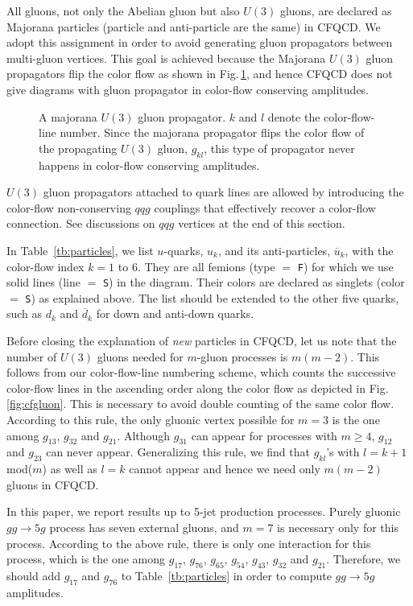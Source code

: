 All gluons, not only the Abelian gluon but also $U(3)$ gluons, are declared as Majorana particles (particle and anti-particle are the same)
in CFQCD. We adopt this assignment in order to avoid generating
gluon propagators between multi-gluon vertices. This goal is achieved because the
Majorana $U(3)$ gluon propagators flip the color flow as shown in Fig.\,\ref{fig:majoprop}, and hence
CFQCD does not give diagrams with gluon propagator in color-flow
conserving amplitudes.
\begin{figure}
\centering
{}
\caption{A majorana $U(3)$ gluon propagator. $k$ and $l$ denote the
 color-flow-line number. Since the majorana propagator
 flips the color flow of the propagating $U(3)$ gluon, $g_{kl}$, this type of
 propagator never happens in color-flow conserving amplitudes. }
\label{fig:majoprop}
\end{figure}
$U(3)$ gluon propagators attached to quark lines
are allowed by introducing the color-flow non-conserving $qqg$ couplings
that effectively recover a color-flow connection. See discussions on $qqg$
vertices at the end of this section.

In Table~\ref{tb:particles}, we list $u$-quarks, $u_k$, and its
anti-particles, $\overline{u}_k$, with the color-flow index $k=1$
to $6$. They are all femions (type $=$ {\tt F}) for which we use solid
lines (line $=$ {\tt S}) in the diagram. Their colors are declared as
singlets (color $=$ {\tt S}) as explained above. The list should be
extended to the other five quarks, such as $d_k$ and $\overline{d}_k$ for down and anti-down quarks.

Before closing the explanation of {\it new} particles in CFQCD, let us note
 that the number of $U(3)$ gluons needed for $m$-gluon processes is $m(m-2)$. This follows from
our color-flow-line numbering scheme, which counts the successive
color-flow lines in the
ascending order along the color flow as depicted in
Fig.\,\ref{fig:cfgluon}. This is necessary to avoid
double counting of the same color flow. According to this rule, the only
gluonic vertex possible for $m=3$ is the one among $g_{13}$, $g_{32}$ and
$g_{21}$. Although $g_{31}$ can appear
 for processes
 with $m\geq4$, $g_{12}$ and $g_{23}$ can
never appear. Generalizing this rule, we find that $g_{kl}$'s with $l=k+1$ mod($m$) as well as $l=k$ cannot appear and hence we need only $m(m-2)$ gluons in CFQCD.

In this paper, we report results up to 5-jet production
processes. Purely gluonic $gg\rightarrow  5g$ process has seven external
gluons, and $m=7$ is necessary only for this process. According to the
above rule, there is only one interaction for this process, which is
the one among $g_{17}$,
$g_{76}$, $g_{65}$, $g_{54}$, $g_{43}$, $g_{32}$ and
$g_{21}$. Therefore, we should
 add $g_{17}$ and $g_{76}$ to Table~\ref{tb:particles} in order to
 compute $gg\rightarrow 5g$ amplitudes.

